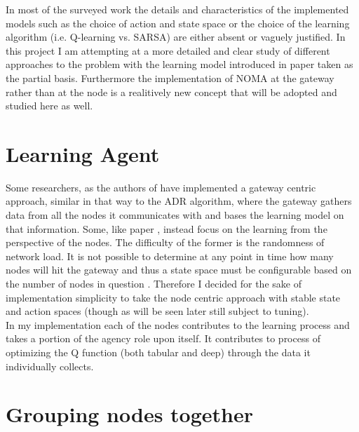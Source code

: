 In most of the surveyed work the details and characteristics
of the implemented models such as the choice of action and
state space or the choice of the learning algorithm 
(i.e. Q-learning vs. SARSA) are either absent or vaguely justified. In this project I am attempting at a more
detailed and clear study of different approaches to the 
problem with the learning model introduced in paper \cite{rl_lora_original} taken as the partial basis. 
Furthermore the implementation of NOMA at the gateway
rather than at the node is a realitively new concept
that will be adopted and studied here as well.



\section{Learning Agent}

Some researchers, as the authors of \cite{rl_lora_sarsa_dqn} have implemented a gateway
centric approach, similar in that way to the ADR algorithm, where the 
gateway gathers data from all the nodes
it communicates with and bases the learning model on that information. 
Some, like paper \cite{rl_lora_original}, instead focus on the learning
from the perspective of the nodes. The difficulty of the former is 
the randomness of network load. It is not possible to determine at 
any point in time how many nodes will hit the gateway and thus 
a state space must be configurable based on the number of nodes 
in question \cite{rl_lora_sarsa_dqn}. Therefore I decided for the sake
of implementation simplicity to take the node centric approach with 
stable state and action spaces (though as will be seen later still
subject to tuning). \\

In my implementation each of the nodes contributes to the learning 
process and takes a portion of the agency role upon itself. It
contributes to process of optimizing the Q function (both tabular and
deep) through the data it individually collects.

\section{Grouping nodes together}

